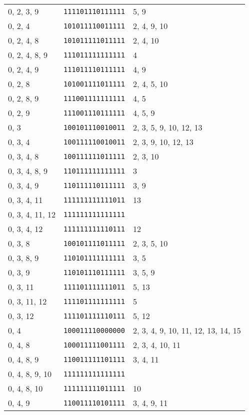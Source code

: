 \documentclass[a4paper,12pt]{article}
\begin{document}
\begin{longtable}{l|l|l}
        0, 2, 3, 9&\texttt{111101110111111}&5, 9\\
        0, 2, 4&\texttt{101011110011111}&2, 4, 9, 10\\
        0, 2, 4, 8&\texttt{101011111011111}&2, 4, 10\\
        0, 2, 4, 8, 9&\texttt{111011111111111}&4\\
        0, 2, 4, 9&\texttt{111011110111111}&4, 9\\
        0, 2, 8&\texttt{101001111011111}&2, 4, 5, 10\\
        0, 2, 8, 9&\texttt{111001111111111}&4, 5\\
        0, 2, 9&\texttt{111001110111111}&4, 5, 9\\
        0, 3&\texttt{100101110010011}&2, 3, 5, 9, 10, 12, 13\\
        0, 3, 4&\texttt{100111110010011}&2, 3, 9, 10, 12, 13\\
        0, 3, 4, 8&\texttt{100111111011111}&2, 3, 10\\
        0, 3, 4, 8, 9&\texttt{110111111111111}&3\\
        0, 3, 4, 9&\texttt{110111110111111}&3, 9\\
        0, 3, 4, 11&\texttt{111111111111011}&13\\
        0, 3, 4, 11, 12&\texttt{111111111111111}&\\
        0, 3, 4, 12&\texttt{111111111110111}&12\\
        0, 3, 8&\texttt{100101111011111}&2, 3, 5, 10\\
        0, 3, 8, 9&\texttt{110101111111111}&3, 5\\
        0, 3, 9&\texttt{110101110111111}&3, 5, 9\\
        0, 3, 11&\texttt{111101111111011}&5, 13\\
        0, 3, 11, 12&\texttt{111101111111111}&5\\
        0, 3, 12&\texttt{111101111110111}&5, 12\\
        0, 4&\texttt{100011110000000}&2, 3, 4, 9, 10, 11, 12, 13, 14, 15\\
        0, 4, 8&\texttt{100011111001111}&2, 3, 4, 10, 11\\
        0, 4, 8, 9&\texttt{110011111101111}&3, 4, 11\\
        0, 4, 8, 9, 10&\texttt{111111111111111}&\\
        0, 4, 8, 10&\texttt{111111111011111}&10\\
        0, 4, 9&\texttt{110011110101111}&3, 4, 9, 11\\

\end{longtable}
\end{document}
